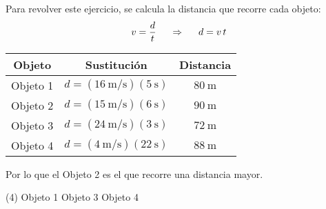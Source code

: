 \documentclass[12pt, letter]{exam}
\begin{document}
\begin{questions}
    \vspace*{1cm}
    Para revolver este ejercicio, se calcula la distancia que recorre cada objeto:
    \begin{align*}
    v = \dfrac{d}{t} \hspace{0.5cm} \Rightarrow \hspace{0.5cm} d = v \, t
    \end{align*}
    \begin{table}[H]
        \centering
        \renewcommand{\arraystretch}{2}
        \begin{tabular}{c | c | c}
            Objeto & Sustitución & Distancia \\ \hline
            Objeto 1 & $d = \left( \displaystyle \SI[per-mode=fraction]{16}{\meter\per\second} \right) (\SI{5}{\second})$ & $\SI{80}{\meter}$ \\ \hline
            Objeto 2 & $d = \left( \displaystyle \SI[per-mode=fraction]{15}{\meter\per\second} \right) (\SI{6}{\second})$ & $\SI{90}{\meter}$ \\ \hline
            Objeto 3 & $d = \left( \displaystyle \SI[per-mode=fraction]{24}{\meter\per\second} \right) (\SI{3}{\second})$ & $\SI{72}{\meter}$ \\ \hline
            Objeto 4 & $d = \left( \displaystyle \SI[per-mode=fraction]{4}{\meter\per\second} \right) (\SI{22}{\second})$ & $\SI{88}{\meter}$ \\ \hline
        \end{tabular}
    \end{table}
    Por lo que el Objeto 2 es el que recorre una distancia mayor.
    \begin{tasks}(4)
        \task Objeto 1
        \task {}
        \task Objeto 3
        \task Objeto 4        
    \end{tasks}



\end{questions}
\end{document}
